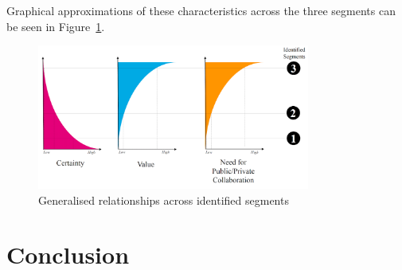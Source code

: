 \documentclass[b5paper,10pt]{article}
\begin{document}
Graphical approximations of these characteristics across the three
segments can be seen in Figure~\ref{fig:segmentcharacteristics}.

\begin{figure}[!h]
\centering
\includegraphics[width=0.8\textwidth]{images/segmentcharacteristics.png}
\caption{Generalised relationships across identified segments}
\label{fig:segmentcharacteristics}
\end{figure}




 


\section{Conclusion}\label{conclusion}
\end{document}
